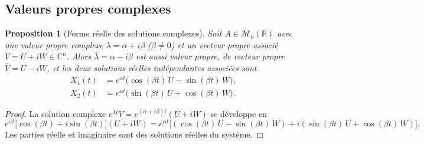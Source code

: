 \documentclass[12pt,a4paper,openany]{book}
\theoremstyle{definition}
\theoremstyle{plain}
\newtheorem{proposition}[definition]{Proposition}
\theoremstyle{remark}
\newcommand{\R}{\mathbb{R}}
\newcommand{\C}{\mathbb{C}}
\begin{document}
\subsection{Valeurs propres complexes}\label{subsec:vp-complexes}

\begin{proposition}[Forme réelle des solutions complexes]\label{prop:vp-complexes}
  Soit $A \in \mathcal{M}_n(\R)$ avec une valeur propre complexe
  $\lambda = \alpha + i\beta$ ($\beta \neq 0$) et un vecteur propre
  associé $V = U + iW \in \C^n$. Alors $\bar\lambda = \alpha - i\beta$
  est aussi valeur propre, de vecteur propre $\bar V = U - iW$, et
  les deux solutions réelles indépendantes associées sont
  \begin{align}\label{eq:sol-reelle-complexe}
    X_1(t) &= e^{\alpha t}\bigl(\cos(\beta t)\,U - \sin(\beta t)\,W\bigr), \\
    X_2(t) &= e^{\alpha t}\bigl(\sin(\beta t)\,U + \cos(\beta t)\,W\bigr).
  \end{align}
\end{proposition}

\begin{proof}
  La solution complexe $e^{\lambda t}V = e^{(\alpha+i\beta)t}(U+iW)$
  se développe en
  \[
    e^{\alpha t}\bigl[\cos(\beta t) + i\sin(\beta t)\bigr](U + iW)
    = e^{\alpha t}\bigl[(\cos(\beta t)\,U - \sin(\beta t)\,W)
      + i(\sin(\beta t)\,U + \cos(\beta t)\,W)\bigr].
  \]
  Les parties réelle et imaginaire sont des solutions réelles du système.
\end{proof}
\end{document}
